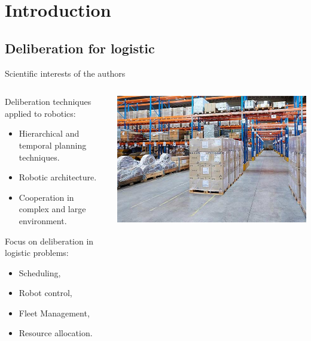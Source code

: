 \section{Introduction}
\subsection{Deliberation for logistic}

\begin{frame}{Scientific interests of the authors}
    \centering
\begin{columns}
    \begin{column}{0.5\textwidth}
        Deliberation techniques applied to robotics:
        \small
        \begin{itemize}
            \item Hierarchical and temporal planning techniques.
            \item Robotic architecture.
            \item Cooperation in complex and large environment.
        \end{itemize}
        Focus on deliberation in logistic problems: 
        \small
        \begin{itemize}
            \item Scheduling,
            \item Robot control,
            \item Fleet Management,
            \item Resource allocation.
        \end{itemize}
    \end{column}
    \begin{column}{0.5\textwidth}
        \includegraphics[width = \textwidth]{images/logisticsolutions.jpg}
    \end{column}
\end{columns}

\end{frame}

